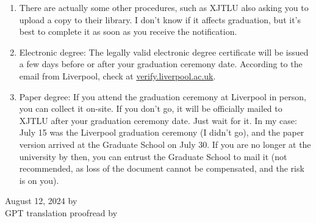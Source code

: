\begin{enumerate}
    \item There are actually some other procedures, such as XJTLU also asking you to upload a copy to their library. I don't know if it affects graduation, but it's best to complete it as soon as you receive the notification.
    \item Electronic degree: The legally valid electronic degree certificate will be issued a few days before or after your graduation ceremony date. According to the email from Liverpool, check at \url{verify.liverpool.ac.uk}.
    \item Paper degree: If you attend the graduation ceremony at Liverpool in person, you can collect it on-site. If you don't go, it will be officially mailed to XJTLU after your graduation ceremony date. Just wait for it. In my case: July 15 was the Liverpool graduation ceremony (I didn't go), and the paper version arrived at the Graduate School on July 30. If you are no longer at the university by then, you can entrust the Graduate School to mail it (not recommended, as loss of the document cannot be compensated, and the risk is on you).
\end{enumerate}

\begin{flushright}
    August 12, 2024 by \Wu \\
    GPT translation proofread by \Shiyao
\end{flushright}